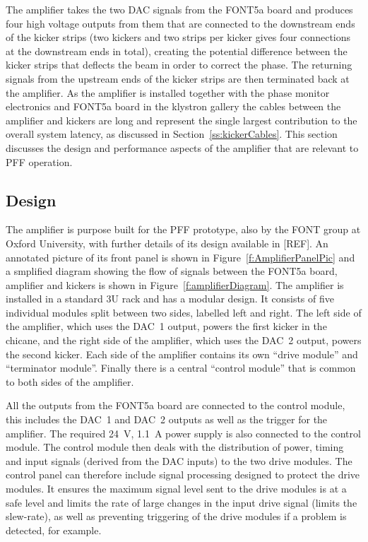 
The amplifier takes the two DAC signals from the FONT5a board and produces four high voltage outputs from them that are connected to the downstream ends of the kicker strips (two kickers and two strips per kicker gives four connections at the downstream ends in total), creating the potential difference between the kicker strips that deflects the beam in order to correct the phase. The returning signals from the upstream ends of the kicker strips are then terminated back at the amplifier. As the amplifier is installed together with the phase monitor electronics and FONT5a board in the klystron gallery the cables between the amplifier and kickers are long and represent the single largest contribution to the overall system latency, as discussed in Section~\ref{ss:kickerCables}. This section discusses the design and performance aspects of the amplifier that are relevant to PFF operation.

\subsection{Design}
\label{ss:ampDesign}

The amplifier is purpose built for the PFF prototype, also by the FONT group at Oxford University, with further details of its design available in [REF]. An annotated picture of its front panel is shown in Figure~\ref{f:AmplifierPanelPic} and a smplified diagram showing the flow of signals between the FONT5a board, amplifier and kickers is shown in Figure~\ref{f:amplifierDiagram}.
The amplifier is installed in a standard 3U rack and has a modular design. It consists of five individual modules split between two sides, labelled left and right. The left side of the amplifier, which uses the DAC~1 output, powers the first kicker in the chicane, and the right side of the amplifier, which uses the DAC~2 output, powers the second kicker. Each side of the amplifier contains its own ``drive module'' and ``terminator module''. Finally there is a central ``control module'' that is common to both sides of the amplifier.

All the outputs from the FONT5a board are connected to the control module, this includes the DAC~1 and DAC~2 outputs as well as the trigger for the amplifier. The required 24~V, 1.1~A power supply is also connected to the control module. The control module then deals with the distribution of power, timing and input signals (derived from the DAC inputs) to the two drive modules. The control panel can therefore include signal processing designed to protect the drive modules. It ensures the maximum signal level sent to the drive modules is at a safe level and limits the rate of large changes in the input drive signal (limits the slew-rate), as well as preventing triggering of the drive modules if a problem is detected, for example.

